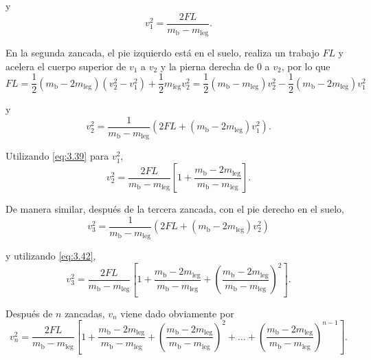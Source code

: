 \documentclass[12pt]{book}
\begin{document}
y
\begin{equation}
v_1^2 = \frac{2FL}{m_{\text{b}} - m_{\text{leg}}}.
\label{eq:3.39}
\end{equation}

En la segunda zancada, el pie izquierdo está en el suelo, realiza un trabajo $FL$ y acelera el cuerpo superior de $v_1$ a $v_2$ y la pierna derecha de $0$ a $v_2$, por lo que
\begin{equation}
FL = \frac{1}{2}(m_{\text{b}} - 2m_{\text{leg}})(v_2^2 - v_1^2) + \frac{1}{2}m_{\text{leg}}v_2^2 = \frac{1}{2}(m_{\text{b}} - m_{\text{leg}})v_2^2 - \frac{1}{2}(m_{\text{b}} - 2m_{\text{leg}})v_1^2
\label{eq:3.40}
\end{equation}

y
\begin{equation}
v_2^2 = \frac{1}{m_{\text{b}} - m_{\text{leg}}}(2FL + (m_{\text{b}} - 2m_{\text{leg}})v_1^2).
\label{eq:3.41}
\end{equation}

Utilizando \eqref{eq:3.39} para $v_1^2$,
\begin{equation}
v_2^2 = \frac{2FL}{m_{\text{b}} - m_{\text{leg}}} \left[ 1 + \frac{m_{\text{b}} - 2m_{\text{leg}}}{m_{\text{b}} - m_{\text{leg}}} \right].
\label{eq:3.42}
\end{equation}

De manera similar, después de la tercera zancada, con el pie derecho en el suelo,
\begin{equation}
v_3^2 = \frac{1}{m_{\text{b}} - m_{\text{leg}}}(2FL + (m_{\text{b}} - 2m_{\text{leg}})v_2^2)
\label{eq:3.43}
\end{equation}

y utilizando \eqref{eq:3.42},
\begin{equation}
v_3^2 = \frac{2FL}{m_{\text{b}} - m_{\text{leg}}} \left[ 1 + \frac{m_{\text{b}} - 2m_{\text{leg}}}{m_{\text{b}} - m_{\text{leg}}} + \left( \frac{m_{\text{b}} - 2m_{\text{leg}}}{m_{\text{b}} - m_{\text{leg}}} \right)^2 \right].
\label{eq:3.44}
\end{equation}

Después de $n$ zancadas, $v_n$ viene dado obviamente por
\begin{equation}
v_n^2 = \frac{2FL}{m_{\text{b}} - m_{\text{leg}}} \left[ 1 + \frac{m_{\text{b}} - 2m_{\text{leg}}}{m_{\text{b}} - m_{\text{leg}}} + \left( \frac{m_{\text{b}} - 2m_{\text{leg}}}{m_{\text{b}} - m_{\text{leg}}} \right)^2 + \dots + \left( \frac{m_{\text{b}} - 2m_{\text{leg}}}{m_{\text{b}} - m_{\text{leg}}} \right)^{n-1} \right].
\label{eq:3.45}
\end{equation}
\end{document}
